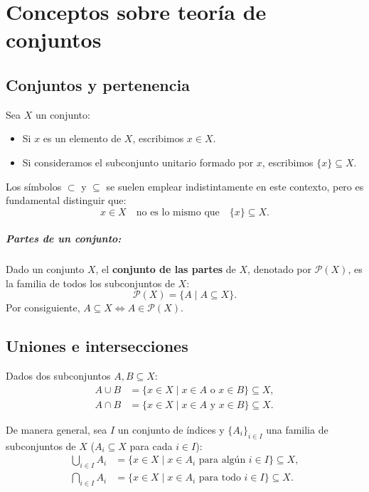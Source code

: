 \setcounter{chapter}{-1}
\chapter{Conceptos sobre teor\'ia de conjuntos}
\section{Conjuntos y pertenencia}

Sea $X$ un conjunto:
\begin{itemize}
    \item Si $x$ es un elemento de $X$, escribimos $x \in X$.
    \item Si consideramos el subconjunto unitario formado por $x$, escribimos $\{x\} \subseteq X$.
\end{itemize}

\begin{obs}
Los símbolos $\subset$ y $\subseteq$ se suelen emplear indistintamente en este contexto, pero es fundamental distinguir que:
$$
    x \in X \quad\text{no es lo mismo que}\quad \{x\} \subseteq X \text{}.
$$
\end{obs}

\paragraph{Partes de un conjunto:}
Dado un conjunto $X$, el \textbf{conjunto de las partes} de $X$, denotado por $\mathcal{P}(X)$, es la familia de todos los subconjuntos de $X$:
$$
    \mathcal{P}(X) = \{A \mid A \subseteq X\} \text{}.
$$
Por consiguiente, $A \subseteq X \iff A \in \mathcal{P}(X)$.

\section{Uniones e intersecciones}

Dados dos subconjuntos $A, B \subseteq X$:
\begin{align*}
    A \cup B &= \{x \in X \mid x \in A \text{ o } x \in B\} \subseteq X \text{}, \\
    A \cap B &= \{x \in X \mid x \in A \text{ y } x \in B\} \subseteq X \text{}.
\end{align*}

De manera general, sea $I$ un conjunto de índices y $\{A_i\}_{i \in I}$ una familia de subconjuntos de $X$ ($A_i \subseteq X$ para cada $i \in I$):
\begin{align*}
    \bigcup_{i \in I} A_i &= \{x \in X \mid x \in A_i \text{ para algún } i \in I\} \subseteq X \text{}, \\
    \bigcap_{i \in I} A_i &= \{x \in X \mid x \in A_i \text{ para todo } i \in I\} \subseteq X \text{}.
\end{align*}

